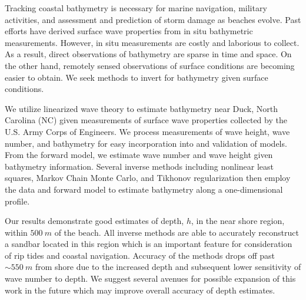 Tracking coastal bathymetry is necessary for marine navigation, military activities, and assessment and prediction of storm damage as beaches evolve. Past efforts have derived surface wave properties from in situ bathymetric measurements. However, in situ measurements are costly and laborious to collect. As a result, direct observations of bathymetry are sparse in time and space. On the other hand, remotely sensed observations of surface conditions are becoming easier to obtain. We seek methods to invert for bathymetry given surface conditions. 

We utilize linearized wave theory to estimate bathymetry near Duck, North Carolina (NC) given measurements of surface wave properties collected by the U.S. Army Corps of Engineers. We process measurements of wave height, wave number, and bathymetry for easy incorporation into and validation of models. From the forward model, we estimate wave number and wave height given bathymetry information. Several inverse methods including nonlinear least squares, Markov Chain Monte Carlo, and Tikhonov regularization then employ the data and forward model to estimate bathymetry along a one-dimensional profile.

Our results demonstrate good estimates of depth, $h$, in the near shore region, within $500~m$ of the beach. All inverse methods are able to accurately reconstruct a sandbar located in this region which is an important feature for consideration of rip tides and coastal navigation. Accuracy of the methods drops off past $\sim550~m$ from shore due to the increased depth and subsequent lower sensitivity of wave number to depth. We suggest several avenues for possible expansion of this work in the future which may improve overall accuracy of depth estimates.